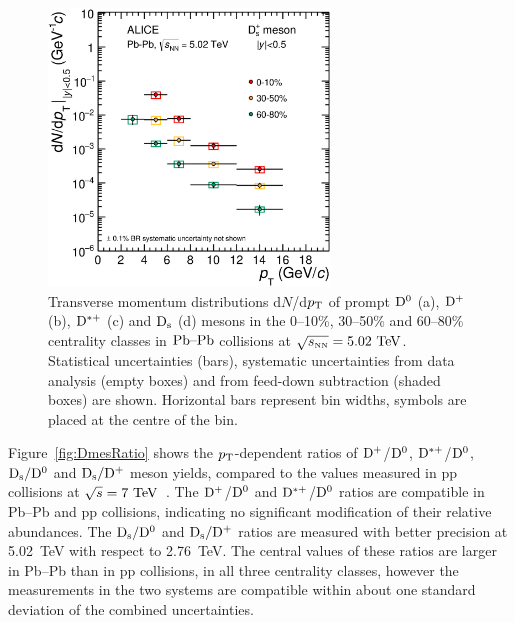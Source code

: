 \begin{figure}[!t]
 \begin{center}
\includegraphics[angle=0, width=7.5cm]{FigCap5/Ds_dNdpt_010_3050_6080.eps}
 \end{center}
 \caption{Transverse momentum distributions d$N$/d$p_{\rm T}$ of 
prompt ${\rm D^0}$ (a), ${\rm D^+}$ (b), ${\rm D^{*+}}$ (c) and ${\rm D_s}$ (d)  mesons in the 0--10\%, 30--50\% and 60--80\% 
centrality classes in $\mbox{Pb--Pb}$ collisions 
at $\sqrt{s_{\rm \scriptscriptstyle NN}}=5.02~\mathrm{TeV}$. 
Statistical uncertainties (bars), systematic uncertainties from data 
analysis (empty boxes) and from feed-down subtraction 
(shaded boxes) are shown. 
Horizontal bars represent bin widths, symbols are placed at the centre of 
the bin. }
 \label{fig:DmesCorrYields010} 
\end{figure} 



Figure~\ref{fig:DmesRatio} shows the $p_{\rm T}$-dependent ratios of
${\rm D^+}$/${\rm D^0}$, ${\rm D^{*+}}$/${\rm D^0}$, ${\rm D_s}/{\rm D^0}$ and ${\rm D_s}/{\rm D^+}$ meson yields, 
compared to the values measured in pp collisions at $\sqrt s=7~\mathrm{TeV}$~\cite{Acharya:2017jgo}. 
The ${\rm D^+}$/${\rm D^0}$ and ${\rm D^{*+}}$/${\rm D^0}$ ratios are compatible in Pb--Pb and pp collisions, 
indicating no significant modification of their relative abundances. 
The ${\rm D_s}/{\rm D^0}$ and ${\rm D_s}/{\rm D^+}$ ratios are measured with better precision at 5.02~TeV with respect to 2.76~TeV.
The central values of these ratios are larger in Pb--Pb than in pp collisions, in all three centrality classes, however
the measurements in the two systems are compatible within about one standard deviation of the combined uncertainties.
\iffalse


